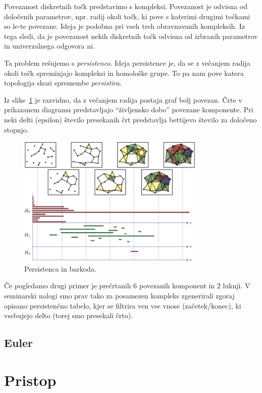 \documentclass[11pt]{article}
\begin{document}
Povezanost diskretnih točk predstavimo s kompleksi. Povezanost je odvisna od določenih parametrov, npr. radij okoli točk, ki pove s katerimi drugimi točkami so le-te povezane. Ideja je podobna pri vseh treh obravnavanih kompleksih. Iz tega sledi, da je povezanost nekih diskretnih točk odvisna od izbranih parametrov in univerzalnega odgovora ni. 

Ta problem rešujemo s \emph{persistenco}. Ideja persistence je, da se z večanjem radija okoli točk spreminjajo kompleksi in homološke grupe. To pa nam pove katera topologija skozi spremembe \emph{persistira}.

Iz slike~\ref{homo} je razvidno, da z večanjem radija  postaja graf bolj povezan. Črte v prikazanem diagramu predstavljajo ``življensko dobo'' povezane komponente. Pri neki delti (epsilon) število presekanih črt predstavlja bettijevo število za določeno stopnjo.

\begin{figure}[htb]
    \centering
    \includegraphics[width=0.8\textwidth]{homo.png}
    \caption{Persistenca in barkoda.}
    \label{homo}
\end{figure}

Če pogledamo drugi primer je prečrtanih 6 povezanih komponent in 2 luknji. V seminarski nalogi smo prav tako za posamezen kompleks zgenerirali zgoraj opisano persistenčno tabelo, kjer se filtrira ven vse vnose (začetek/konec), ki vsebujejo delto (torej smo presekali črto).

\subsection{Euler}

\section{Pristop}
\end{document}
